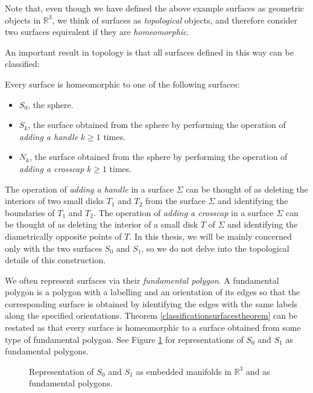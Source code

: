 Note that, even though we have defined the above example surfaces as geometric objects in
$\mathbb{R}^3$, we think of surfaces as \emph{topological} objects, and therefore consider two
surfaces equivalent if they are \emph{homeomorphic}. 

An important result in topology is that all surfaces defined in this way can be classified:

\begin{theorem}
\label{classificationsurfacestheorem}
Every surface is homeomorphic to one of the following surfaces:

\begin{itemize}
	\item $S_0$, the sphere.
	\item $S_k$, the surface obtained from the sphere by performing the operation
	of \emph{adding a handle}  $k \geq 1$ times.
	\item $N_k$, the surface obtained from the sphere by performing the operation
	of \emph{adding a crosscap} $k \geq 1$ times.
\end{itemize}
\end{theorem}

The operation of \emph{adding a handle} in a surface $\Sigma$ can be thought of as deleting the 
interiors of two small  disks $T_1$ and $T_2$ from the surface $\Sigma$ and identifying
the boundaries of $T_1$ and $T_2$.
The operation of \emph{adding a crosscap} in a surface $\Sigma$ can be thought of as deleting the 
interior of a small disk $T$ of $\Sigma$ and identifying the diametrically opposite points of $T$.
In this thesis, we will be mainly concerned only with the two surfaces $S_0$ and $S_1$, so we 
do not delve into the topological details of this construction.

We often represent surfaces via their \emph{fundamental polygon}. A fundamental polygon is a 
polygon with a labelling and an orientation of its edges so that the corresponding surface is
obtained by identifying the edges with the same labels
along the specified orientations. Theorem \ref{classificationsurfacestheorem} can be restated
as that every surface is homeomorphic to a surface obtained from some type of fundamental
polygon. See Figure \ref{fig:spheretorusrepresentation} for representations of $S_0$ and $S_1$ as
fundamental polygons. 

\begin{figure}
\label{fig:spheretorusrepresentation}
\caption{Representation of $S_0$ and $S_1$ as embedded manifolds in $\mathbb{R}^3$ and as fundamental polygons.}
\end{figure}

